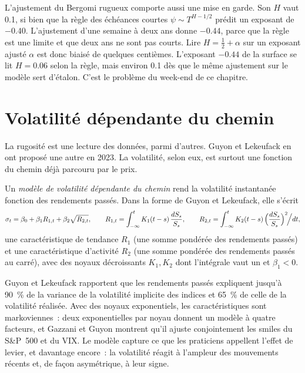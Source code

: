 L'ajustement du Bergomi rugueux comporte aussi une mise en garde. Son $H$ vaut 0.1, si bien que la règle des échéances courtes
$\psi\sim T^{H-1/2}$ prédit un exposant de $-0.40$. L'ajustement d'une semaine à deux ans donne $-0.44$,
parce que la règle est une limite et que deux ans ne sont pas courts. Lire $H=\frac12+\alpha$ sur un exposant ajusté
$\alpha$ est donc biaisé de quelques centièmes. L'exposant $-0.44$ de la surface se lit $H=0.06$ selon la règle, mais
environ 0.1 dès que le même ajustement sur le modèle sert d'étalon. C'est le problème du week-end de ce chapitre.

\section{Volatilité dépendante du chemin}

La rugosité est une lecture des données, parmi d'autres. Guyon et Lekeufack en ont proposé une autre en 2023. La
volatilité, selon eux, est surtout une fonction du chemin déjà parcouru par le prix.

\begin{definition}\label{def:dv:rough-volatility-and-forward-variance-models:pdv}
Un \emph{modèle de volatilité dépendante du chemin} rend la volatilité
instantanée fonction des rendements passés. Dans la forme de Guyon et Lekeufack, elle s'écrit
\[
\sigma_t=\beta_0+\beta_1R_{1,t}+\beta_2\sqrt{R_{2,t}},\qquad
R_{1,t}=\int_{-\infty}^tK_1(t-s)\,\frac{dS_s}{S_s},\qquad R_{2,t}=\int_{-\infty}^tK_2(t-s)\,\Bigl(\frac{dS_s}{S_s}\Bigr)^2\!\Big/dt,
\]
une caractéristique de tendance $R_1$ (une somme pondérée des rendements passés) et une caractéristique d'activité $R_2$ (une somme pondérée des
rendements passés au carré), avec des noyaux décroissants $K_1,K_2$ dont l'intégrale vaut un et $\beta_1<0$.
\end{definition}

Guyon et Lekeufack rapportent que les rendements passés expliquent jusqu'à 90~\% de la variance de la volatilité
implicite des indices et 65~\% de celle de la volatilité réalisée. Avec des noyaux exponentiels, les caractéristiques sont markoviennes~: deux exponentielles
par noyau donnent un modèle à quatre facteurs, et Gazzani et Guyon montrent qu'il ajuste conjointement les smiles du S\&P~500 et du VIX.
Le modèle capture ce que les praticiens appellent l'effet de levier, et davantage encore~: la volatilité réagit à l'ampleur des
mouvements récents et, de façon asymétrique, à leur signe.

